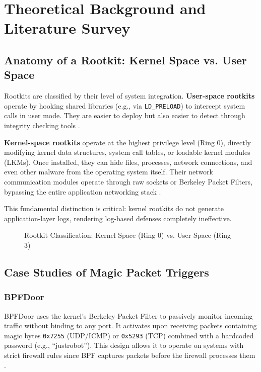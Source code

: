 \chapter{Theoretical Background and Literature Survey}

\section{Anatomy of a Rootkit: Kernel Space vs. User Space}

Rootkits are classified by their level of system integration. \textbf{User-space rootkits} operate by hooking shared libraries (e.g., via \texttt{LD\_PRELOAD}) to intercept system calls in user mode. They are easier to deploy but also easier to detect through integrity checking tools \cite{jynx2012}.

\textbf{Kernel-space rootkits} operate at the highest privilege level (Ring 0), directly modifying kernel data structures, system call tables, or loadable kernel modules (LKMs). Once installed, they can hide files, processes, network connections, and even other malware from the operating system itself. Their network communication modules operate through raw sockets or Berkeley Packet Filters, bypassing the entire application networking stack \cite{elastic2022bpfdoor}.

This fundamental distinction is critical: kernel rootkits do not generate application-layer logs, rendering log-based defenses completely ineffective.

\begin{figure}[h]
\centering
{}
\caption{Rootkit Classification: Kernel Space (Ring 0) vs. User Space (Ring 3)}
\label{fig:kernel_vs_user}
\end{figure}

\section{Case Studies of Magic Packet Triggers}

\subsection{BPFDoor}
BPFDoor uses the kernel's Berkeley Packet Filter to passively monitor incoming traffic without binding to any port. It activates upon receiving packets containing magic bytes \texttt{0x7255} (UDP/ICMP) or \texttt{0x5293} (TCP) combined with a hardcoded password (e.g., ``justrobot''). This design allows it to operate on systems with strict firewall rules since BPF captures packets before the firewall processes them \cite{elastic2022bpfdoor, trend2022bpfdoor}.

